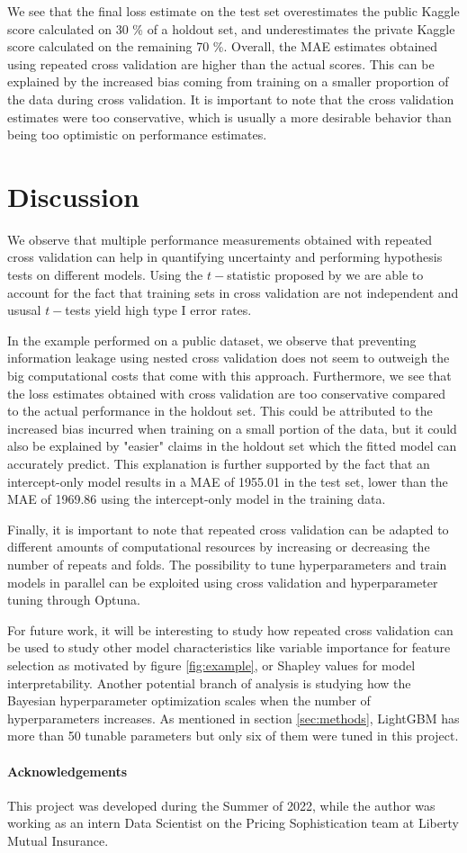 \documentclass[11pt,a4paper]{article}
\theoremstyle{plain}
\theoremstyle{definition}
\begin{document}
We see that the final loss estimate on the test set overestimates the public Kaggle score calculated on 30 \% of a holdout set, and underestimates the private Kaggle score calculated on the remaining 70 \%. Overall, the MAE estimates obtained using repeated cross validation are higher than the actual scores. This can be explained by the increased bias coming from training on a smaller proportion of the data during cross validation. It is important to note that the cross validation estimates were too conservative, which is usually a more desirable behavior than being too optimistic on performance estimates.

\section{Discussion}
\label{sec:discussion}

We observe that multiple performance measurements obtained with repeated cross validation can help in quantifying uncertainty and performing hypothesis tests on different models. Using the $t-$statistic proposed by \citet{ttest} we are able to account for the fact that training sets in cross validation are not independent and ususal $t-$tests yield high type I error rates.

In the example performed on a public dataset, we observe that preventing information leakage using nested cross validation does not seem to outweigh the big computational costs that come with this approach. Furthermore, we see that the loss estimates obtained with cross validation are too conservative compared to the actual performance in the holdout set. This could be attributed to the increased bias incurred when training on a small portion of the data, but it could also be explained by "easier" claims in the holdout set which the fitted model can accurately predict. This explanation is further supported by the fact that an intercept-only model results in a MAE of 1955.01 in the test set, lower than the MAE of 1969.86 using the intercept-only model in the training data.

Finally, it is important to note that repeated cross validation can be adapted to different amounts of computational resources by increasing or decreasing the number of repeats and folds. The possibility to tune hyperparameters and train models in parallel can be exploited using cross validation and hyperparameter tuning through Optuna.

For future work, it will be interesting to study how repeated cross validation can be used to study other model characteristics like variable importance for feature selection as motivated by figure \ref{fig:example}, or Shapley values for model interpretability. Another potential branch of analysis is studying how the Bayesian hyperparameter optimization scales when the number of hyperparameters increases. As mentioned in section \ref{sec:methods}, LightGBM has more than 50 tunable parameters but only six of them were tuned in this project.
	
\paragraph{Acknowledgements} This project was developed during the Summer of 2022, while the author was working as an intern Data Scientist on the Pricing Sophistication team at Liberty Mutual Insurance.

\newpage


\end{document}
